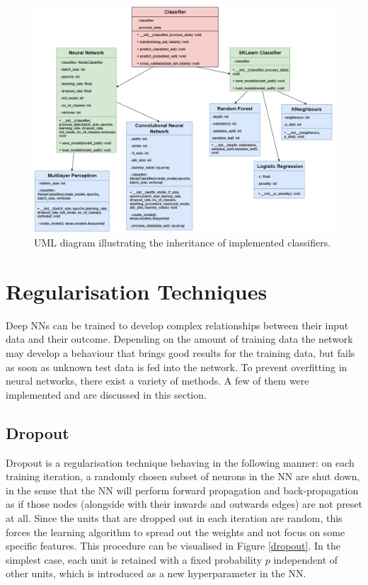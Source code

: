 \begin{figure}[H]
  \centering
  \centerline{\includegraphics[scale = 0.7]{Images/uml.png}}
  \caption{UML diagram illustrating the inheritance of implemented classifiers.}
  \label{OOP}
\end{figure}

\section{Regularisation Techniques}

Deep NNs can be trained to develop complex relationships between their input data and their outcome. Depending on the amount of training data the network may develop a behaviour that brings good results for the training data, but fails as soon as unknown test data is fed into the network. To prevent overfitting in neural networks, there exist a variety of methods. A few of them were implemented and are discussed in this section.

\subsection{Dropout}

Dropout is a regularisation technique behaving in the following manner: on each training iteration, a randomly chosen subset of neurons in the NN are shut down, in the sense that the NN will perform forward propagation and back-propagation as if those nodes (alongside with their inwards and outwards edges) are not preset at all. Since the units that are dropped out in each iteration are random, this forces the learning algorithm to spread out the weights and not focus on some specific features. This procedure can be visualised in Figure \ref{dropout}. In the simplest case, each unit is retained with a fixed probability $p$ independent of other units, which is introduced as a new hyperparameter in the NN. \\

